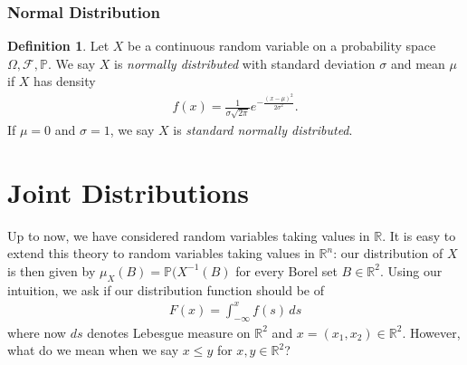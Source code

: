 \documentclass[12pt]{article}
\newcommand{\rr}{\mathbb{R}}
\newcommand{\filter}{\mathcal{F}}
\newcommand{\prob}{\mathbb{P}}
\theoremstyle{plain}
\theoremstyle{definition}
\newtheorem*{definition}{Definition}
\theoremstyle{remark}
\numberwithin{equation}{section}  %
\begin{document}
\subsubsection{Normal Distribution}
\begin{definition}
Let $X$ be a continuous random variable on a probability space $\Omega, \filter,
\prob$. We say $X$ is \emph{normally distributed} with standard deviation $\sigma$ and
mean $\mu$ if $X$ has density
\begin{align*}
f(x) = \frac{1}{\sigma \sqrt{2 \pi}} e^{-\frac{(x - \mu)^2}{2 \sigma^2}}.
\end{align*}
If $\mu = 0$ and $\sigma =1$, we say $X$ is \emph{standard normally
distributed}.
\end{definition}
\section{Joint Distributions}
Up to now, we have considered random variables taking values in $\rr$.
It is easy to extend this theory to random variables taking values in $\rr^n$:
our distribution of $X$ is then given by $\mu_X(B) =
\prob(X^{-1}(B)$ for every Borel set $B \in
\rr^2$. Using our intuition, we ask if our distribution function should be of
\begin{align*}
F(x) = \int_{-\infty}^{x} f(s) \, ds
\end{align*}
where now $ds$ denotes Lebesgue measure on $\rr^2$ and $x = (x_1, x_2) \in
\rr^2$. However, what do we mean when we say $x \le y$ for $x, y \in \rr^2$? 
\end{document}
